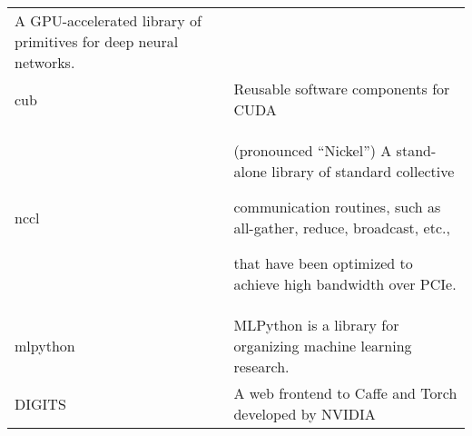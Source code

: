 \documentclass[]{article}
\begin{document}
\begin{longtable}[]{@{}ll@{}}
\begin{minipage}[t]{0.18\columnwidth}
A GPU-accelerated library of primitives for deep neural networks.\strut

\end{minipage}\tabularnewline

\begin{minipage}[t]{0.17\columnwidth}\raggedright\strut

cub\strut

\end{minipage} & \begin{minipage}[t]{0.18\columnwidth}\raggedright\strut

Reusable software components for CUDA\strut

\end{minipage}\tabularnewline

\begin{minipage}[t]{0.17\columnwidth}\raggedright\strut

nccl\strut

\end{minipage} & \begin{minipage}[t]{0.18\columnwidth}\raggedright\strut

(pronounced ``Nickel'') A stand-alone library of standard collective

communication routines, such as all-gather, reduce, broadcast, etc.,

that have been optimized to achieve high bandwidth over PCIe.\strut

\end{minipage}\tabularnewline

\begin{minipage}[t]{0.17\columnwidth}\raggedright\strut

mlpython\strut

\end{minipage} & \begin{minipage}[t]{0.18\columnwidth}\raggedright\strut

MLPython is a library for organizing machine learning research.\strut

\end{minipage}\tabularnewline

\begin{minipage}[t]{0.17\columnwidth}\raggedright\strut

DIGITS\strut

\end{minipage} & \begin{minipage}[t]{0.18\columnwidth}\raggedright\strut

A web frontend to Caffe and Torch developed by NVIDIA\strut

\end{minipage}\tabularnewline

\bottomrule

\end{longtable}
\end{document}
